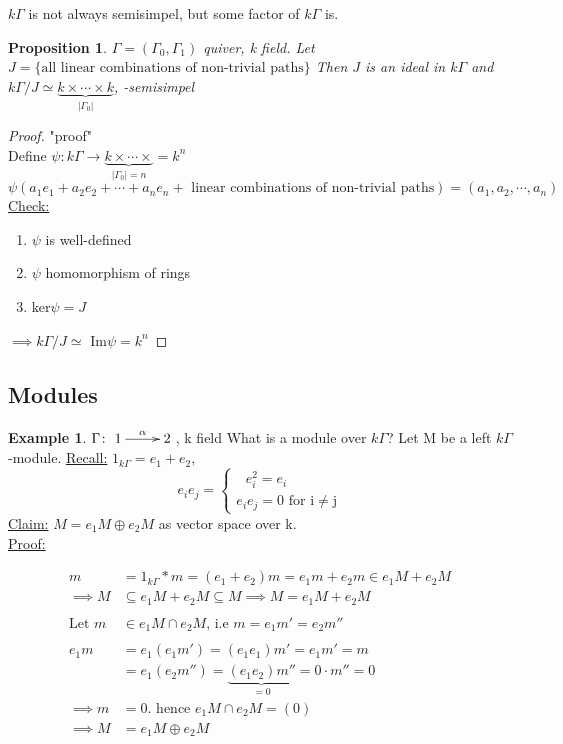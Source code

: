 \documentclass{amsart}
\numberwithin{equation}{section}
\newtheorem{prop}[thm]{Proposition}
\theoremstyle{definition}
\newtheorem{exam}[thm]{Example}
\newcommand{\G}{\Gamma}
\begin{document}
$k\G$ is not always semisimpel, but some factor of $k\G$ is.\newline

\begin{prop}
	$\G=(\G_0,\G_1) $ quiver, k field. Let $J = \{\text{all linear combinations of non-trivial paths}\}$
	Then $J$ is an ideal in $k\G$ and $k\G/J \simeq \underbrace{k \times \cdots \times k}_{|\G_0|}$, -semisimpel
\end{prop}

\begin{proof}"proof"\\
	Define $\psi\colon k\G \rightarrow \underbrace{k \times \cdots \times}_{|\G_0|=n} = k^n $\\
	$\psi(a_1e_1 + a_2e_2 + \cdots + a_ne_n + \text{ linear combinations of non-trivial paths} ) = (a_1, a_2, \cdots, a_n)$\\\newline
	\underline{Check:} \begin{enumerate}
		\item  $\psi$ is well-defined
		\item $\psi$ homomorphism of rings
		\item ker$\psi=J$
	\end{enumerate}
	$\implies k\G/J \simeq$ Im$\psi=k^n$
\end{proof}

\subsection{Modules}
\begin{exam}
	$\Gamma\colon \xymatrix{1\ar[r]^\alpha & 2}$, k field
	What is a module over $k\G$? Let M be a left $k\G$-module.
	\underline{Recall:} 
	$1_{k\G}=e_1 + e_2$, \[e_ie_j=  
	\begin{cases}	\text{\ $e_i^2 = e_i$}\\
	\text{$e_ie_j = 0$ for i$\neq$j}
	\end{cases}\]
	\underline{Claim:} $M = e_1M\oplus e_2M$ as vector space over k.\\\newline
	\underline{Proof:}
	
	\begin{align*}
	m &= 1_{k\G}*m=(e_1 + e_2)m = e_1m+e_2m \in e_1M + e_2M\\
	\implies M &\subseteq e_1M + e_2M \subseteq M \implies M = e_1M + e_2M\\\\
	\text{Let } m&\in e_1M \cap e_2M \text{, i.e } m=e_1m'=e_2m''\\\\
	e_1m&=e_1(e_1m')=(e_1e_1)m'=e_1m'=m\\
	&= e_1(e_2m'')=\underbrace{(e_1e_2)m''}_{=0}=0\cdot m''=0\\
	\implies m &=0. \text{ hence } e_1M \cap e_2M = (0)\\
	\implies M &= e_1M \oplus e_2M\\ 
	\end{align*}
	
	
	
	
	
\end{exam}
\end{document}
